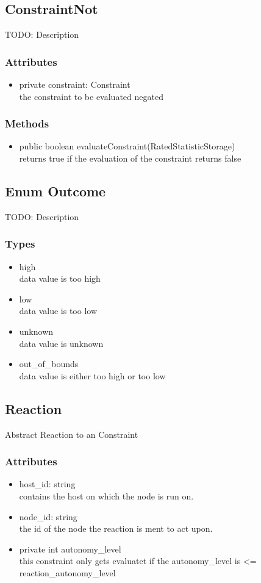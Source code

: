 \subsection{ConstraintNot }
TODO: Description

\subsubsection{Attributes}
\begin{itemize}
	\item private constraint: Constraint\\
	the constraint to be evaluated negated
\end{itemize}
\subsubsection{Methods}
\begin{itemize}
	\item public boolean evaluateConstraint(RatedStatisticStorage)\\
	returns true if the evaluation of the constraint returns false
\end{itemize}

\subsection{Enum Outcome }
TODO: Description

\subsubsection{Types}
\begin{itemize}
	\item high\\
	data value is too high
	\item low\\
	data value is too low
	\item unknown\\
	data value is unknown
	\item out\_of\_bounds\\
	data value is either too high or too low
\end{itemize}


\subsection{Reaction}
	Abstract Reaction to an Constraint
\subsubsection{Attributes}
\begin{itemize}
	\item host\_id: string \\
		contains the host on which the node is run on.
	\item node\_id: string \\
		the id of the node the reaction is ment to act upon.
	\item private  int autonomy\_level\\
		this constraint only gets evaluatet if 
		the autonomy\_level is <= reaction\_autonomy\_level
\end{itemize}
